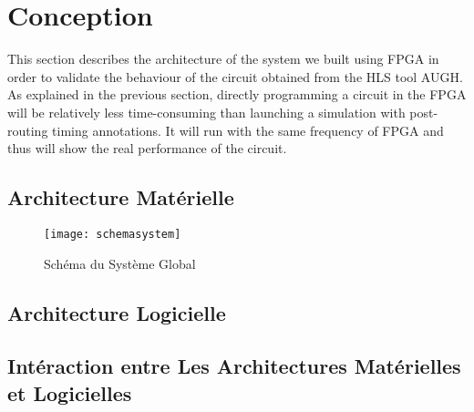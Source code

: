 \chapter{Conception}
\label{chap:concep}
\OnehalfSpacing

This section describes the architecture of the system we built using FPGA in order to validate the behaviour of the circuit
obtained from the HLS tool AUGH.
As explained in the previous section, directly programming a circuit in the FPGA will be relatively less time-consuming than
launching a simulation with post-routing timing annotations. It will run with the same frequency of FPGA and thus will show
the real performance of the circuit.

\section{Architecture Matérielle}

\begin{figure}[h]
	\label{fig:system}
	\centering
	\texttt{[image: schemasystem]}
	\caption{Schéma du Système Global \cite{Brisebard2015}}
	\vspace{-2mm}
\end{figure}



\section{Architecture Logicielle}



\section[Intéraction entre Les Deux]{Intéraction entre Les Architectures Matérielles et Logicielles}
